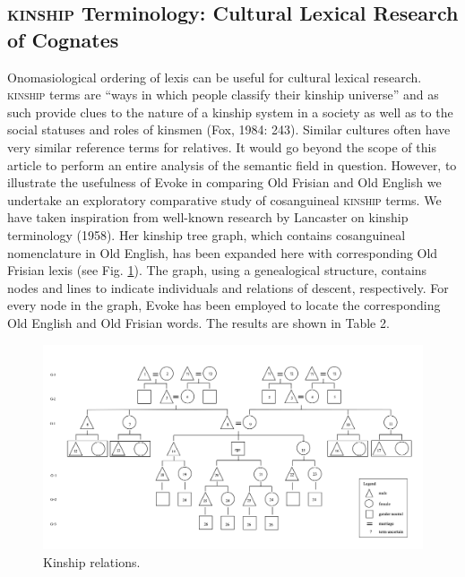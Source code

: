 \subsection{\textsc{kinship} Terminology: Cultural Lexical Research of Cognates}
Onomasiological ordering of lexis can be useful for cultural lexical research. \textsc{kinship} terms are “ways in which people classify their kinship universe” and as such provide clues to the nature of a kinship system in a society as well as to the social statuses and roles of kinsmen (Fox, 1984: 243). Similar cultures often have very similar reference terms for relatives. It would go beyond the scope of this article to perform an entire analysis of the semantic field in question. However, to illustrate the usefulness of Evoke in comparing Old Frisian and Old English we undertake an exploratory comparative study of cosanguineal \textsc{kinship} terms. We have taken inspiration from well-known research by Lancaster on kinship terminology (1958). Her kinship tree graph, which contains cosanguineal nomenclature in Old English, has been expanded here with corresponding Old Frisian lexis (see Fig. \ref{fig:Stolk2021b:Fig4}). The graph, using a genealogical structure, contains nodes and lines to indicate individuals and relations of descent, respectively.  For every node in the graph, Evoke has been employed to locate the corresponding Old English and Old Frisian words. The results are shown in Table 2. 


\begin{figure}[htbp]
    \includegraphics[width=\textwidth]{Stolk2021b/fig/Fig4.png}
	\caption[]{\label{fig:Stolk2021b:Fig4} Kinship relations.}
\end{figure}

